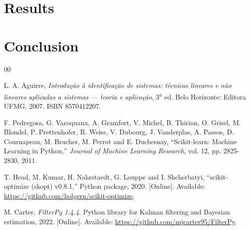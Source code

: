 \documentclass[conference]{IEEEtran}
\begin{document}
\section{Results} \label{sec:results}

\section{Conclusion} \label{sec:conclusion}

\begin{thebibliography}{00}

L. A. Aguirre, \emph{Introdução à identificação de sistemas: técnicas lineares e não lineares aplicadas a sistemas — teoria e aplicação}, 3\textsuperscript{a} ed. Belo Horizonte: Editora UFMG, 2007. ISBN 8570412207.

F. Pedregosa, G. Varoquaux, A. Gramfort, V. Michel, B. Thirion, O. Grisel, M. Blondel, P. Prettenhofer, R. Weiss, V. Dubourg, J. Vanderplas, A. Passos, D. Cournapeau, M. Brucher, M. Perrot and E. Duchesnay, “Scikit-learn: Machine Learning in Python,” \emph{Journal of Machine Learning Research}, vol. 12, pp. 2825-2830, 2011.

T. Head, M. Kumar, H. Nahrstaedt, G. Louppe and I. Shcherbatyi, “scikit-optimize (skopt) v0.8.1,” Python package, 2020. [Online]. Available: \url{https://github.com/holgern/scikit-optimize}.

M. Carter, \emph{FilterPy 1.4.4}. Python library for Kalman filtering and Bayesian estimation, 2022. [Online]. Available: \url{https://github.com/mjcarter95/FilterPy}.

\end{thebibliography}
\end{document}
